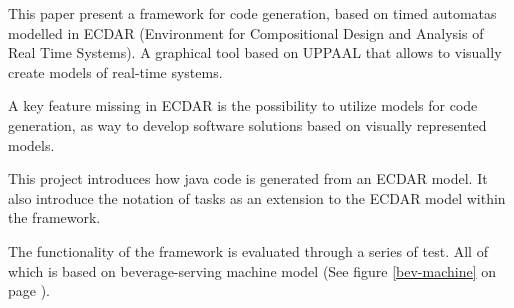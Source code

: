 This paper present a framework for code generation, based on timed automatas
modelled in ECDAR (Environment for Compositional Design and Analysis of Real
Time Systems). A graphical tool based on UPPAAL that allows to visually create
models of real-time systems.

A key feature missing in ECDAR is the possibility to utilize models for code
generation, as way to develop software solutions based on visually represented
models.

This project introduces how java code is generated from an ECDAR model. It also
introduce the notation of tasks as an extension to the ECDAR model within the
framework.

The functionality of the framework is evaluated through a series of test. All of
which is based on beverage-serving machine model (See figure \ref{bev-machine}
on page \pageref{bev-machine}).



